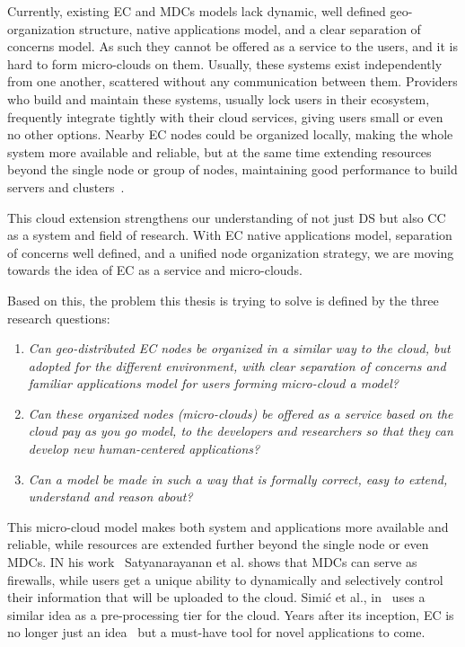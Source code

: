 Currently, existing EC and MDCs models lack dynamic, well defined geo-organization structure, native applications model, and a clear separation of concerns model. As such they cannot be offered as a service to the users, and it is hard to form micro-clouds on them. Usually, these systems exist independently from one another, scattered without any communication between them. Providers who build and maintain these systems, usually lock users in their ecosystem, frequently integrate tightly with their cloud services, giving users small or even no other options. Nearby EC nodes could be organized locally, making the whole system more available and reliable, but at the same time extending resources beyond the single node or group of nodes, maintaining good performance to build servers and clusters~\cite{ArocaG12}.

This cloud extension strengthens our understanding of not just DS but also CC as a system and field of research. With EC native applications model, separation of concerns well defined, and a unified node organization strategy, we are moving towards the idea of EC as a service and micro-clouds. 

Based on this, the problem this thesis is trying to solve is defined by the three research questions:

\begin{enumerate}[start=1,label={(\bfseries \arabic*)}]\label{questions}
	\item \textit{Can geo-distributed EC nodes be organized in a similar  way to the cloud, but adopted for the different environment, with clear separation of concerns and familiar applications model for users forming micro-cloud a model?}
	\item \textit{Can these organized nodes (micro-clouds) be offered as a service based on the cloud pay as you go model, to the developers and researchers so that they can develop new human-centered applications?}
	\item \textit{Can a model be made in such a way that is formally correct, easy to extend, understand and reason about?}
\end{enumerate}

\noindent
This micro-cloud model makes both system and applications more available and reliable, while resources are extended further beyond the single node or even MDCs. IN his work~\cite{SatyanarayananK19} Satyanarayanan et al. shows that MDCs can serve as firewalls, while users get a unique ability to dynamically and selectively control their information that will be uploaded to the cloud.  Simi\' c et al., in~\cite{inproceedingsSimic1} uses a similar idea as a pre-processing tier for the cloud. Years after its inception, EC is no longer just an idea~\cite{SatyanarayananK19} but a must-have tool for novel applications to come. 
%
%
